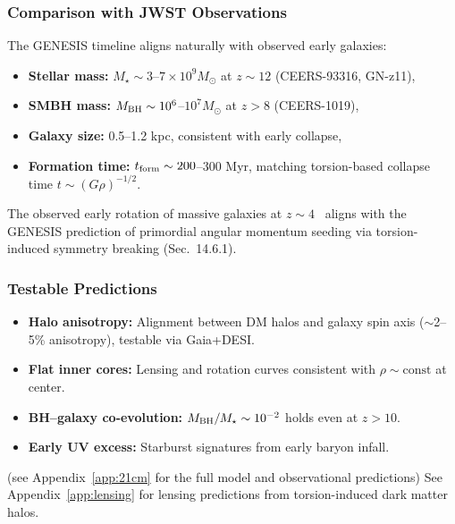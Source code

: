 \documentclass{article}
\begin{document}
\subsubsection{Comparison with JWST Observations}
The GENESIS timeline aligns naturally with observed early galaxies:
\begin{itemize}
  \item \textbf{Stellar mass:} $M_\star \sim 3$--$7 \times 10^9 M_\odot$ at $z \sim 12$ (CEERS-93316, GN-z11),
  \item \textbf{SMBH mass:} $M_{\rm BH} \sim 10^6$--$10^7 M_\odot$ at $z > 8$ (CEERS-1019),
  \item \textbf{Galaxy size:} 0.5--1.2 kpc, consistent with early collapse,
  \item \textbf{Formation time:} $t_{\rm form} \sim 200$--$300$ Myr, matching torsion-based collapse time $t \sim (G \rho)^{-1/2}$.
\end{itemize}

The observed early rotation of massive galaxies at \( z \sim 4 \)~\cite{inoue2021} aligns with the GENESIS prediction of primordial angular momentum seeding via torsion-induced symmetry breaking (Sec.~14.6.1).


\subsubsection{Testable Predictions}
\begin{itemize}
  \item \textbf{Halo anisotropy:} Alignment between DM halos and galaxy spin axis ($\sim$2--5\% anisotropy), testable via Gaia+DESI.
  \item \textbf{Flat inner cores:} Lensing and rotation curves consistent with $\rho \sim \text{const}$ at center.
  \item \textbf{BH--galaxy co-evolution:} $M_{\rm BH}/M_\star \sim 10^{-2}$ holds even at $z>10$.
  \item \textbf{Early UV excess:} Starburst signatures from early baryon infall.
\end{itemize}

(see Appendix~\ref{app:21cm} for the full model and observational predictions)
See Appendix~\ref{app:lensing} for lensing predictions from torsion-induced dark matter halos.
\end{document}

